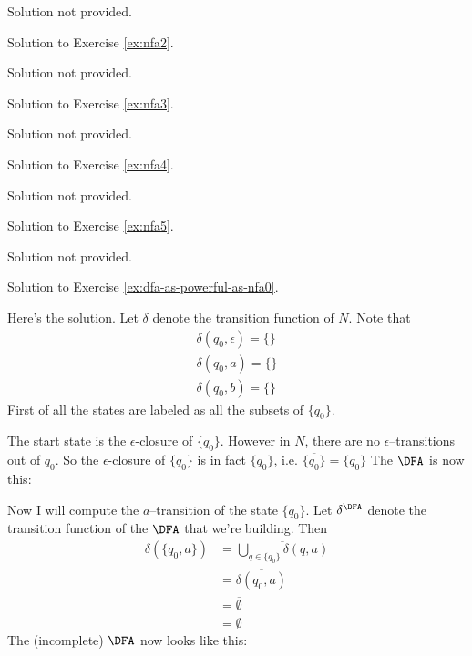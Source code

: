 
    Solution not provided.
    

\newpage

Solution to Exercise \ref{ex:nfa2}.


    Solution not provided.
    

\newpage

Solution to Exercise \ref{ex:nfa3}.


    Solution not provided.
    

\newpage

Solution to Exercise \ref{ex:nfa4}.


    Solution not provided.
    

\newpage

Solution to Exercise \ref{ex:nfa5}.


    Solution not provided.
    

\newpage

Solution to Exercise \ref{ex:dfa-as-powerful-as-nfa0}.

Here's the solution.
Let $\delta$ denote the transition function of $N$.
Note that 
\begin{align*}
  \delta(q_0, \epsilon) = \{\} \\
  \delta(q_0, a) = \{\} \\
  \delta(q_0, b) = \{\} 
\end{align*}
First of all the states are labeled as all the subsets of $\{q_0\}$.



The start state is the $\epsilon$-closure of $\{q_0\}$.
However in $N$, there are no $\epsilon$--transitions out of 
$q_0$.
So the $\epsilon$-closure of $\{q_0\}$ is in fact $\{q_0\}$, i.e.
$\overline{\{q_0\}} = \{q_0\}$
The $\DFA$ is now this:



Now I will compute the $a$--transition of the state $\{q_0\}$.
Let $\delta^\DFA$ denote the transition function of the $\DFA$
that we're building.
Then
\begin{align*}
\delta( \{q_0, a\} ) 
&= \overline{ \bigcup_{q \in \{q_0\}} \delta(q, a)} \\
&= \overline{ \delta(q_0, a) } \\
&= \overline{ \emptyset } \\
&= \emptyset
\end{align*}
The (incomplete) $\DFA$ now looks like this:

